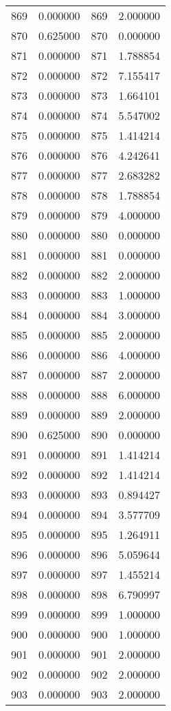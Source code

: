 \documentclass[12pt]{article}
\begin{document}
\begin{longtable}{@{}cccc@{}}
869 & 0.000000 & 869 & 2.000000 \\
870 & 0.625000 & 870 & 0.000000 \\
871 & 0.000000 & 871 & 1.788854 \\
872 & 0.000000 & 872 & 7.155417 \\
873 & 0.000000 & 873 & 1.664101 \\
874 & 0.000000 & 874 & 5.547002 \\
875 & 0.000000 & 875 & 1.414214 \\
876 & 0.000000 & 876 & 4.242641 \\
877 & 0.000000 & 877 & 2.683282 \\
878 & 0.000000 & 878 & 1.788854 \\
879 & 0.000000 & 879 & 4.000000 \\
880 & 0.000000 & 880 & 0.000000 \\
881 & 0.000000 & 881 & 0.000000 \\
882 & 0.000000 & 882 & 2.000000 \\
883 & 0.000000 & 883 & 1.000000 \\
884 & 0.000000 & 884 & 3.000000 \\
885 & 0.000000 & 885 & 2.000000 \\
886 & 0.000000 & 886 & 4.000000 \\
887 & 0.000000 & 887 & 2.000000 \\
888 & 0.000000 & 888 & 6.000000 \\
889 & 0.000000 & 889 & 2.000000 \\
890 & 0.625000 & 890 & 0.000000 \\
891 & 0.000000 & 891 & 1.414214 \\
892 & 0.000000 & 892 & 1.414214 \\
893 & 0.000000 & 893 & 0.894427 \\
894 & 0.000000 & 894 & 3.577709 \\
895 & 0.000000 & 895 & 1.264911 \\
896 & 0.000000 & 896 & 5.059644 \\
897 & 0.000000 & 897 & 1.455214 \\
898 & 0.000000 & 898 & 6.790997 \\
899 & 0.000000 & 899 & 1.000000 \\
900 & 0.000000 & 900 & 1.000000 \\
901 & 0.000000 & 901 & 2.000000 \\
902 & 0.000000 & 902 & 2.000000 \\
903 & 0.000000 & 903 & 2.000000 \\

\end{longtable}
\end{document}
